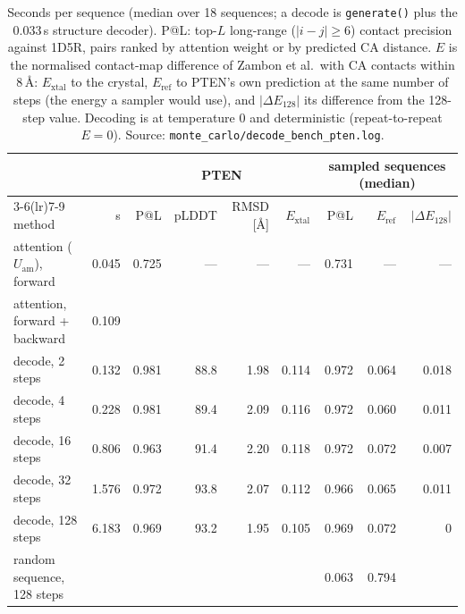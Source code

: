 \documentclass[11pt,a4paper]{article}
\newcommand{\file}[1]{\texttt{#1}}
\newcommand{\Uam}{U_{\mathrm{am}}}
\begin{document}
\begin{table}[h]
\centering
\small
\begin{tabular}{lrrrrrrrr}
\toprule
 & & \multicolumn{4}{c}{PTEN} & \multicolumn{3}{c}{sampled sequences (median)} \\
\cmidrule(lr){3-6}\cmidrule(lr){7-9}
method & s & P@L & pLDDT & RMSD [\AA] & $E_{\mathrm{xtal}}$ & P@L & $E_{\mathrm{ref}}$ & $|\Delta E_{128}|$ \\
\midrule
attention ($\Uam$), forward       & 0.045 & 0.725 & --- & --- & --- & 0.731 & --- & --- \\
attention, forward + backward     & 0.109 & & & & & & & \\
decode, 2 steps   & 0.132 & 0.981 & 88.8 & 1.98 & 0.114 & 0.972 & 0.064 & 0.018 \\
decode, 4 steps   & 0.228 & 0.981 & 89.4 & 2.09 & 0.116 & 0.972 & 0.060 & 0.011 \\
decode, 16 steps  & 0.806 & 0.963 & 91.4 & 2.20 & 0.118 & 0.972 & 0.072 & 0.007 \\
decode, 32 steps  & 1.576 & 0.972 & 93.8 & 2.07 & 0.112 & 0.966 & 0.065 & 0.011 \\
decode, 128 steps & 6.183 & 0.969 & 93.2 & 1.95 & 0.105 & 0.969 & 0.072 & 0 \\
\midrule
random sequence, 128 steps & & & & & & 0.063 & 0.794 & \\
\bottomrule
\end{tabular}
\caption{Seconds per sequence (median over 18 sequences; a decode is
\texttt{generate()} plus the 0.033\,s structure decoder). P@L: top-$L$
long-range ($|i-j|\ge 6$) contact precision against 1D5R, pairs ranked by
attention weight or by predicted CA distance. $E$ is the normalised
contact-map difference of Zambon et al.\ with CA contacts within 8\,\AA:
$E_{\mathrm{xtal}}$ to the crystal, $E_{\mathrm{ref}}$ to PTEN's own prediction
at the same number of steps (the energy a sampler would use), and
$|\Delta E_{128}|$ its difference from the 128-step value. Decoding is at
temperature 0 and deterministic (repeat-to-repeat $E = 0$). Source:
\file{monte\_carlo/decode\_bench\_pten.log}.}
\end{table}
\end{document}
